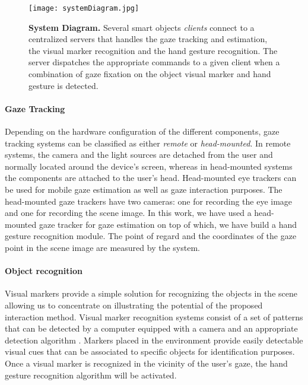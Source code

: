 \documentclass[jou,a4paper,notxfonts]{apa}
\begin{document}
\begin{figure}[tp]
 \texttt{[image: systemDiagram.jpg]}
 \caption{\textbf{System Diagram.} Several smart objects \emph{clients} connect to a centralized servers that handles the gaze tracking and estimation, the visual marker recognition and the hand gesture recognition. The server dispatches the appropriate commands to a given client when a combination of gaze fixation on the object visual marker and hand gesture is detected.}
 \label{systemDiagram}
\end{figure}


\paragraph{Gaze Tracking}


Depending on the hardware configuration of the different components, gaze tracking systems can be classified as either \textit{remote} or \textit{head-mounted}. In remote systems, the camera and the light sources are detached from the
user and normally located around the device's screen, whereas in head-mounted systems the components are attached to the user's head. Head-mounted eye trackers can be used for mobile gaze estimation as well as gaze interaction purposes. The head-mounted gaze trackers have two cameras: one for recording the eye image and one for recording the scene image. In this work, we have used a head-mounted gaze tracker for gaze estimation on top of which, we have build a hand gesture recognition module. The point of regard and the coordinates of the gaze point in the scene image are measured by the system.  

\paragraph{Object recognition}
Visual markers provide a simple solution for recognizing the objects in the scene allowing us to concentrate on illustrating the potential of the proposed interaction method. Visual marker recognition systems consist of a set of patterns that can be detected by a computer equipped with a camera and an appropriate detection algorithm \cite{middel19detection}. Markers placed in the environment provide easily detectable visual cues that can be associated to specific objects for identification purposes. Once a visual marker is recognized in the vicinity of the user's gaze, the hand gesture recognition algorithm will be activated.
\end{document}
